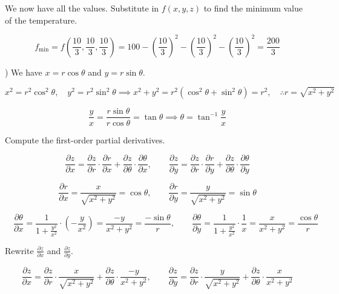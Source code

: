 \documentclass{article}
\begin{document}
\hfill

\noindent We now have all the values. Substitute in $f(x,y,z)$ to find the minimum value of the temperature.

\[f_{\text{min}}=f\left(\frac{10}{3},\frac{10}{3},\frac{10}{3}\right)=100-\left(\frac{10}{3}\right)^2-\left(\frac{10}{3}\right)^2-\left(\frac{10}{3}\right)^2=\boxed{\frac{200}{3}}\]

\hfill

) We have $x=r\cos\theta$ and $y=r\sin\theta$.

\[x^2=r^2\cos^2\theta,\quad y^2 =r^2\sin^2\theta\implies x^2+y^2=r^2\left(\cos^2\theta+\sin^2\theta\right)=r^2, \quad \therefore  r=\sqrt{x^2+y^2}\]

\[\frac{y}{x}=\frac{r\sin\theta}{r\cos\theta}=\tan\theta \implies \theta=\tan^{-1}\frac{y}{x}\]

\hfill

\noindent Compute the first-order partial derivatives.

\[\frac{\partial z}{\partial x}=\frac{\partial z}{\partial r}\cdot\frac{\partial r}{\partial x}+\frac{\partial z}{\partial \theta}\cdot\frac{\partial\theta}{\partial x},\quad\quad\frac{\partial z}{\partial y}=\frac{\partial z}{\partial r}\cdot\frac{\partial r}{\partial y} + \frac{\partial z}{\partial\theta}\cdot\frac{\partial\theta}{\partial y}\]

\hfill

\[\frac{\partial r}{\partial x}=\frac{x}{\sqrt{x^2+y^2}}=\cos\theta,\quad\quad\frac{\partial r}{\partial y}=\frac{y}{\sqrt{x^2+y^2}}=\sin\theta\]

\hfill

\[\quad\frac{\partial\theta}{\partial x}=\frac{1}{\displaystyle 1+\frac{y^2}{x^2}}\cdot \left(-\frac{y}{x^2}\right)=\frac{-y}{x^2+y^2}=\frac{-\sin\theta}{r},\quad\quad\frac{\partial\theta}{\partial y}=\frac{1}{\displaystyle1+\frac{y^2}{x^2}}\cdot\frac{1}{x}=\frac{x}{x^2+y^2}=\frac{\cos\theta}{r}\]

\hfill

\noindent Rewrite $\displaystyle\frac{\partial z}{\partial x}$ and $\displaystyle\frac{\partial z}{\partial y}$.

\[\frac{\partial z}{\partial x}=\frac{\partial z}{\partial r}\cdot\frac{x}{\sqrt{x^2+y^2}}+\frac{\partial z}{\partial\theta}\cdot\frac{-y}{x^2+y^2},\quad\quad\frac{\partial z}{\partial y}=\frac{\partial z}{\partial r}\cdot\frac{y}{\sqrt{x^2+y^2}}+\frac{\partial z}{\partial \theta}\cdot\frac{x}{x^2+y^2}\]
\end{document}
